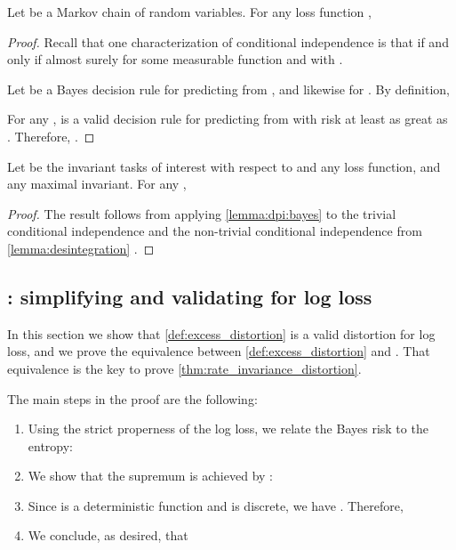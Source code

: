 \documentclass[final]{article}
\begin{document}
\begin{lemma} \label{lemma:dpi:bayes}
	Let  be a Markov chain of random variables. For any loss function ,
	
\end{lemma}
\begin{proof}
	Recall that one characterization of conditional independence is that  if and only if  almost surely for some measurable function  and  with  \citep[][Prop.\ 6.13]{kallenberg_foundations_2002}.


	Let  be a Bayes decision rule for predicting  from , and likewise for . By definition,
	
	For any ,  is a valid decision rule for predicting  from  with risk at least as great as . Therefore, .

\end{proof}

\begin{corollary}\label{lemma:Mx_is_X}
	Let  be the invariant tasks of interest with respect to   and any loss function, and  any maximal invariant. For any ,
	
\end{corollary}
\begin{proof}
	The result follows from applying \cref{lemma:dpi:bayes} to the trivial conditional independence  and the non-trivial conditional independence from \cref{lemma:desintegration} .
\end{proof}


\subsection{\texorpdfstring{}{Prop. 1}: simplifying and validating \texorpdfstring{\disttext{}}{invariant distortion} for log loss}
\label{appx:invariant_distortion}


In this section we show that \cref{def:excess_distortion} is a valid distortion for log loss, and we prove the equivalence between \cref{def:excess_distortion} and . That equivalence is the key to prove \cref{thm:rate_invariance_distortion}.


The main steps in the proof are the following:
\begin{enumerate}[noitemsep]
\item Using the strict properness of the log loss, we relate the Bayes risk to the entropy:

\item We show that the supremum is achieved by :

\item Since  is a deterministic function and  is discrete, we have . Therefore,

\item We conclude, as desired, that

\end{enumerate}
\end{document}
